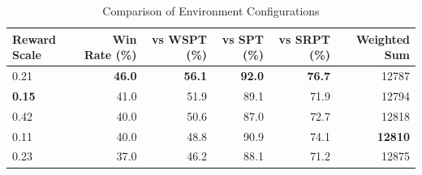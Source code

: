 \begin{table}[htbp]%
\centering%
\begin{tabular}{lrrrrr}%
\toprule%
\textbf{Reward Scale}&\textbf{Win Rate (\%)}&\textbf{vs WSPT (\%)}&\textbf{vs SPT (\%)}&\textbf{vs SRPT (\%)}&\textbf{Weighted Sum}\\%
\midrule%
0.21&\textbf{46.0}&\textbf{56.1}&\textbf{92.0}&\textbf{76.7}&12787\\%
\textbf{0.15}&41.0&51.9&89.1&71.9&12794\\%
0.42&40.0&50.6&87.0&72.7&12818\\%
0.11&40.0&48.8&90.9&74.1&\textbf{12810}\\%
0.23&37.0&46.2&88.1&71.2&12875\\%
\bottomrule%
\end{tabular}%
\caption{Comparison of Environment Configurations}%
\label{tab:environment}%
\end{table}